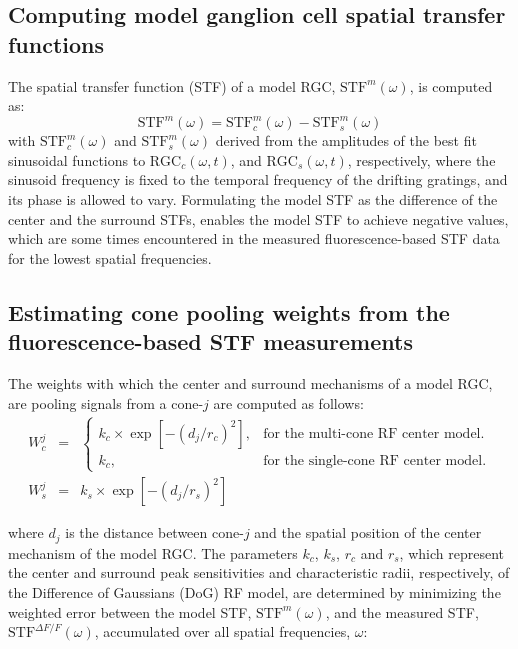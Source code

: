 \documentclass[11pt, oneside]{article}   	%
\begin{document}
\subsection{Computing model ganglion cell spatial transfer functions}
The spatial transfer function (STF) of a model RGC, $\mbox{STF}^{m}(\omega)$, is computed as: 
\begin{equation}
\mbox{STF}^{m}(\omega) = \mbox{STF}_{c}^{m}(\omega) - \mbox{STF}_{s}^{m}(\omega)
\end{equation}
%
\noindent with
%
$\mbox{STF}_{c}^{m}(\omega)$ and $\mbox{STF}_{s}^{m}(\omega)$ derived from the amplitudes of the best fit sinusoidal functions to $\mbox{RGC}_c(\omega,t)$, and $\mbox{RGC}_s(\omega,t)$, respectively, where the sinusoid frequency is fixed to the temporal frequency of the drifting gratings, and its phase is allowed to vary. Formulating the model STF as the difference of the center and the surround STFs, enables the model STF to achieve negative values, which are some times encountered in the measured fluorescence-based STF data for the lowest spatial frequencies.

\subsection{Estimating cone pooling weights from the fluorescence-based STF measurements}

The weights with which the center and surround mechanisms of a model RGC, are pooling signals from a cone-$j$ are computed as follows:
\begin{eqnarray}
W_c^j  & = & \begin{cases}
   k_c \times \exp \left [ -\left( d_{j}/r_c \right) ^2 \right ], & \text{for the multi-cone RF center model}.\\
   k_c, & \text{for the single-cone RF center model}.
   \end{cases} \\
W_s^j &= &k_s \times \exp \left [ -\left( d_{j}/r_s \right) ^2 \right ]
\end{eqnarray}

\noindent where $d_j$ is the distance between cone-$j$ and the spatial position of the center mechanism of the model RGC. The parameters $k_c$, $k_s$, $r_c$ and $r_s$, which represent the center and surround peak sensitivities and characteristic radii, respectively, of the Difference of Gaussians (DoG) RF model, are determined by minimizing the weighted error between the model STF, $\mbox{STF}^{m}(\omega)$, and the measured STF, $\mbox{STF}^{\Delta F / F}(\omega)$, accumulated over all spatial frequencies, $\omega$:
\end{document}
